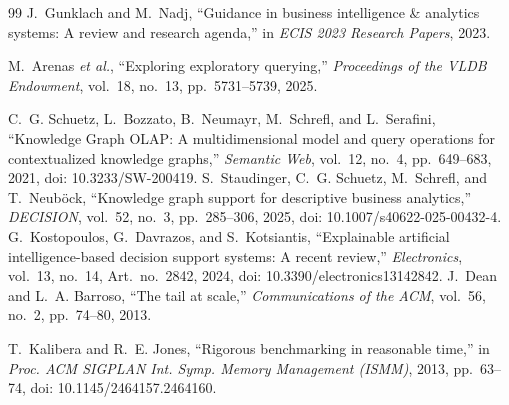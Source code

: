 \documentclass[journal]{IEEEtran}
\begin{document}
\begin{thebibliography}{99}
J.~Gunklach and M.~Nadj, ``Guidance in business intelligence \& analytics systems: A review and research agenda,'' in \emph{ECIS 2023 Research Papers}, 2023.

M.~Arenas \emph{et al.}, ``Exploring exploratory querying,'' \emph{Proceedings of the VLDB Endowment}, vol.~18, no.~13, pp.~5731--5739, 2025.

C.~G. Schuetz, L.~Bozzato, B.~Neumayr, M.~Schrefl, and L.~Serafini, ``Knowledge Graph OLAP: A multidimensional model and query operations for contextualized knowledge graphs,'' \emph{Semantic Web}, vol.~12, no.~4, pp.~649--683, 2021, doi: 10.3233/SW-200419.
S.~Staudinger, C.~G. Schuetz, M.~Schrefl, and T.~Neub\"ock, ``Knowledge graph support for descriptive business analytics,'' \emph{DECISION}, vol.~52, no.~3, pp.~285--306, 2025, doi: 10.1007/s40622-025-00432-4.
G.~Kostopoulos, G.~Davrazos, and S.~Kotsiantis, ``Explainable artificial intelligence-based decision support systems: A recent review,'' \emph{Electronics}, vol.~13, no.~14, Art.~no.~2842, 2024, doi: 10.3390/electronics13142842.
J.~Dean and L.~A. Barroso, ``The tail at scale,'' \emph{Communications of the ACM}, vol.~56, no.~2, pp.~74--80, 2013.

T.~Kalibera and R.~E. Jones, ``Rigorous benchmarking in reasonable time,'' in \emph{Proc. ACM SIGPLAN Int. Symp. Memory Management (ISMM)}, 2013, pp.~63--74, doi: 10.1145/2464157.2464160.

\end{thebibliography}
\end{document}

